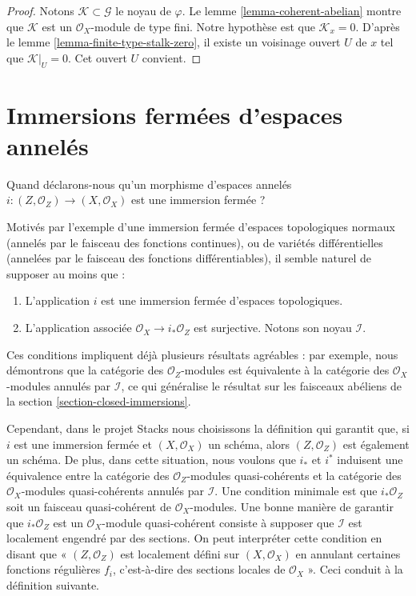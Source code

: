 \begin{proof}
Notons $\mathcal{K} \subset \mathcal{G}$ le noyau de $\varphi$.
Le lemme \ref{lemma-coherent-abelian} montre que $\mathcal{K}$ est
un $\mathcal{O}_X$-module de type fini. Notre hypothèse est que
$\mathcal{K}_x = 0$. D'après le lemme \ref{lemma-finite-type-stalk-zero},
il existe un voisinage ouvert $U$ de $x$ tel que $\mathcal{K}|_U = 0$.
Cet ouvert $U$ convient.
\end{proof}













\section{Immersions fermées d'espaces annelés}
\label{section-closed-immersion}

\noindent
Quand déclarons-nous qu'un morphisme d'espaces annelés
$i : (Z, \mathcal{O}_Z) \to (X, \mathcal{O}_X)$
est une immersion fermée ?

\medskip\noindent
Motivés par l'exemple d'une immersion fermée d'espaces topologiques normaux
(annelés par le faisceau des fonctions continues), ou de variétés différentielles
(annelées par le faisceau des fonctions différentiables), il semble naturel de
supposer au moins que :
\begin{enumerate}
\item L'application $i$ est une immersion fermée d'espaces topologiques.
\item L'application associée $\mathcal{O}_X \to i_*\mathcal{O}_Z$
est surjective. Notons son noyau $\mathcal{I}$.
\end{enumerate}
Ces conditions impliquent déjà plusieurs résultats agréables : par exemple,
nous démontrons que la catégorie des $\mathcal{O}_Z$-modules est équivalente à
la catégorie des $\mathcal{O}_X$-modules annulés par $\mathcal{I}$,
ce qui généralise le résultat sur les faisceaux abéliens de la
section \ref{section-closed-immersions}.

\medskip\noindent
Cependant, dans le projet Stacks nous choisissons la
définition qui garantit que, si $i$ est une immersion fermée
et $(X, \mathcal{O}_X)$ un schéma, alors $(Z, \mathcal{O}_Z)$
est également un schéma. De plus, dans cette situation, nous voulons que $i_*$ et $i^*$
induisent une équivalence entre la catégorie des
$\mathcal{O}_Z$-modules quasi-cohérents et la catégorie des
$\mathcal{O}_X$-modules quasi-cohérents annulés par $\mathcal{I}$.
Une condition minimale est que $i_*\mathcal{O}_Z$ soit un
faisceau quasi-cohérent de $\mathcal{O}_X$-modules.
Une bonne manière de garantir que $i_*\mathcal{O}_Z$ est un
$\mathcal{O}_X$-module quasi-cohérent consiste à supposer que
$\mathcal{I}$ est localement engendré par des sections.
On peut interpréter cette condition en disant que « $(Z, \mathcal{O}_Z)$ est
localement défini sur $(X, \mathcal{O}_X)$ en annulant certaines fonctions régulières
$f_i$, c'est-à-dire des sections locales de $\mathcal{O}_X$ ».
Ceci conduit à la définition suivante.

